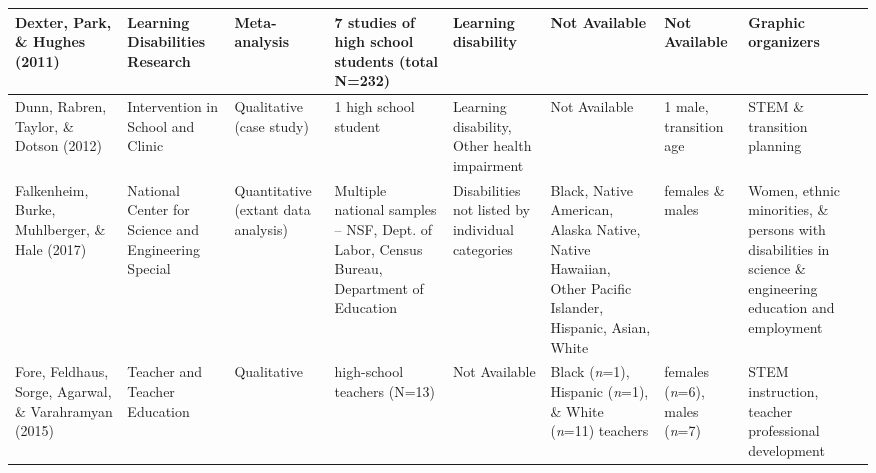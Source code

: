 \documentclass[11.5pt]{sig-alternate}
\begin{document}
\begin{@twocolumnfalse}
\begin{table}
\begin{tabular}{m{0.72in}m{0.72in}m{0.72in}m{0.72in}m{0.72in}m{0.72in}m{0.72in}m{0.72in}}
Dexter, Park, \& Hughes (2011)                          & Learning Disabilities Research                                  & Meta- analysis                        & 7 studies of high school students (total N=232)                                              & Learning disability                               &  \centering Not Available                                                                                          &  \centering Not Available                                                    & Graphic organizers                                                                                       \\ \hline
Dunn, Rabren, Taylor, \& Dotson (2012)                  & Intervention in School and Clinic                               & Qualitative (case study)              & 1 high school student                                                                        & Learning disability, Other health impairment      &  \centering Not Available                                                                                          & 1 male, transition age                                           & STEM \& transition planning                                                                              \\ \hline
Falkenheim, Burke, Muhlberger, \& Hale (2017)           & National Center for Science and Engineering Special             & Quantitative (extant data analysis)   & Multiple national samples – NSF, Dept. of Labor, Census Bureau, Department of Education      & Disabilities not listed by individual categories  & Black, Native American, Alaska Native, Native Hawaiian, Other Pacific Islander, Hispanic, Asian, White & females \& males                                                 & Women, ethnic minorities, \& persons with disabilities in science \& engineering education and employment \\ \hline
Fore, Feldhaus, Sorge, Agarwal, \& Varahramyan (2015)   & Teacher and Teacher Education                                   & Qualitative                           & high-school teachers (N=13)                                                                  &  \centering Not Available                                     & Black (\textit{n}=1), Hispanic (\textit{n}=1), \& White (\textit{n}=11) teachers                                                  & females (\textit{n}=6), males (\textit{n}=7)                                       & STEM instruction, teacher professional development                                                       \\ \hline

\end{tabular}
\end{table}
\end{@twocolumnfalse}
\end{document}
